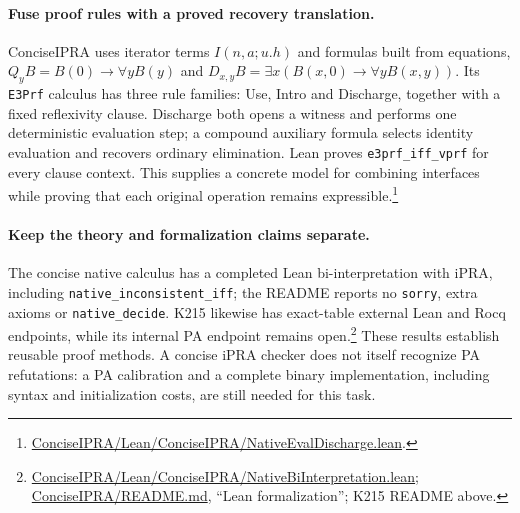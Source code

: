 \paragraph{Fuse proof rules with a proved recovery translation.}
ConciseIPRA uses iterator terms $I(n,a;u.h)$ and formulas built from
equations, $Q_yB=B(0)\to\forall yB(y)$ and
$D_{x,y}B=\exists x(B(x,0)\to\forall yB(x,y))$.
Its \texttt{E3Prf} calculus has three rule families: Use, Intro and
Discharge, together with a fixed reflexivity clause. Discharge both opens
a witness and performs one deterministic evaluation step; a compound
auxiliary formula selects identity evaluation and recovers ordinary
elimination. Lean proves \texttt{e3prf\_iff\_vprf} for every clause
context. This supplies a concrete model for combining interfaces while
proving that each original operation remains expressible.\footnote{\href{https://github.com/VladimirReshetnikov/ProveIt/blob/4be5c6e3a10292a7466f5d3687e3b39615ff049b/Logic/PrimitiveRecursiveArithmetic/ConciseIPRA/Lean/ConciseIPRA/NativeEvalDischarge.lean}{ConciseIPRA/Lean/ConciseIPRA/NativeEvalDischarge.lean}.}

\paragraph{Keep the theory and formalization claims separate.}
The concise native calculus has a completed Lean bi-interpretation with
iPRA, including \texttt{native\_inconsistent\_iff}; the README reports
no \texttt{sorry}, extra axioms or \texttt{native\_decide}. K215 likewise
has exact-table external Lean and Rocq endpoints, while its internal PA
endpoint remains open.\footnote{\href{https://github.com/VladimirReshetnikov/ProveIt/blob/4be5c6e3a10292a7466f5d3687e3b39615ff049b/Logic/PrimitiveRecursiveArithmetic/ConciseIPRA/Lean/ConciseIPRA/NativeBiInterpretation.lean}{ConciseIPRA/Lean/ConciseIPRA/NativeBiInterpretation.lean}; \href{https://github.com/VladimirReshetnikov/ProveIt/blob/4be5c6e3a10292a7466f5d3687e3b39615ff049b/Logic/PrimitiveRecursiveArithmetic/ConciseIPRA/README.md}{ConciseIPRA/README.md}, ``Lean formalization''; K215 README above.}
These results establish reusable proof methods. A concise iPRA checker
does not itself recognize PA refutations: a PA calibration and a complete
binary implementation, including syntax and initialization costs, are
still needed for this task.
